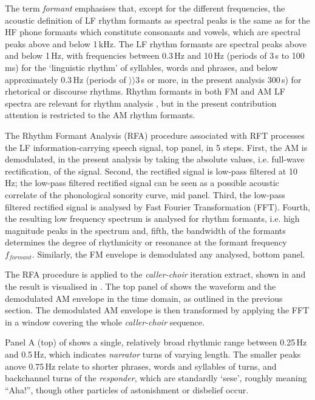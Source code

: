\documentclass[output=paper,colorlinks,citecolor=brown]{langscibook}
\begin{document}
The term \textit{formant} emphasises that, except for the different frequencies, the acoustic definition of LF rhythm formants as spectral peaks is the same as for the HF phone formants which constitute consonants and vowels, which are spectral peaks above and below 1\,kHz. The LF rhythm formants are spectral peaks above and below 1\,Hz, with frequencies between 0.3\,Hz and 10\,Hz (periods of 3\,s to 100\,ms) for the `linguistic rhythm' \citep{libermanprince1977} of syllables, words and phrases, and below approximately 0.3\,Hz (periods of $\rangle\rangle$3\,s or more, in the present analysis 300\,s) for rhetorical or discourse rhythms. Rhythm formants in both FM and AM LF spectra are relevant for rhythm analysis \citep{gibbonsp2018, gibbonjipa2021, gibbonsp2022, gibbon4urua2022}, but in the present contribution attention is restricted to the AM rhythm formants.

The Rhythm Formant Analysis (RFA) procedure associated with RFT processes the LF information-carrying speech signal,  top panel, in 5 steps. First, the AM is demodulated, in the present analysis by taking the absolute values, i.e. full-wave rectification, of the signal. Second, the rectified signal is low-pass filtered at 10 Hz; the low-pass filtered rectified signal can be seen as a possible acoustic correlate of the phonological sonority curve,  mid panel. Third, the low-pass filtered rectified signal is analysed by Fast Fourier Transformation (FFT). Fourth, the resulting low frequency spectrum is analysed for rhythm formants, i.e. high magnitude peaks in the spectrum and, fifth, the bandwidth of the formants determines the degree of rhythmicity or resonance at the formant frequency $f_{formant}$. Similarly, the FM envelope is demodulated any analysed,  bottom panel.

The RFA procedure is applied to the \textit{caller-choir} iteration extract, shown in  and the result is visualised in . The top panel of  shows the waveform and the demodulated AM envelope in the time domain, as outlined in the previous section. The demodulated AM envelope is then transformed by applying the FFT in a window covering the whole \textit{caller-choir} sequence.

Panel A (top) of  shows a single, relatively broad rhythmic range between 0.25\,Hz and 0.5\,Hz, which indicates \textit{narrator} turns of varying length. The smaller peaks anove 0.75\,Hz relate to shorter phrases, words and syllables of turns, and backchannel turns of the \textit{responder}, which are standardly `sese', roughly meaning ``Aha!'', though other particles of astonishment or disbelief occur.
\end{document}
